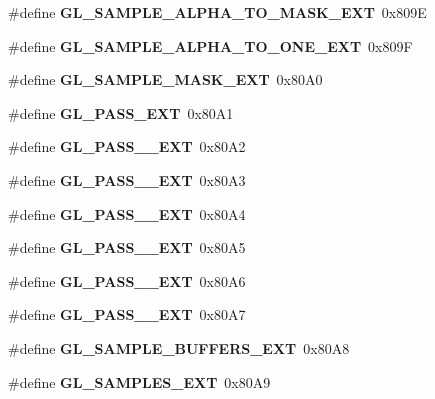 \begin{DoxyCompactItemize}
\item 
\#define {\bfseries G\+L\+\_\+\+S\+A\+M\+P\+L\+E\+\_\+\+A\+L\+P\+H\+A\+\_\+\+T\+O\+\_\+\+M\+A\+S\+K\+\_\+\+E\+X\+T}~0x809\+E\label{_s_d_l__opengl_8h_ac5e63b7e3a6d7e6077abd1b0928d5703}

\item 
\#define {\bfseries G\+L\+\_\+\+S\+A\+M\+P\+L\+E\+\_\+\+A\+L\+P\+H\+A\+\_\+\+T\+O\+\_\+\+O\+N\+E\+\_\+\+E\+X\+T}~0x809\+F\label{_s_d_l__opengl_8h_ae88b3a2be6a94fe1da034561d3a56c57}

\item 
\#define {\bfseries G\+L\+\_\+\+S\+A\+M\+P\+L\+E\+\_\+\+M\+A\+S\+K\+\_\+\+E\+X\+T}~0x80\+A0\label{_s_d_l__opengl_8h_a0981985e5742933b6f57389f22b95945}

\item 
\#define {\bfseries G\+L\+\_\+P\+A\+S\+S\+\_\+\+E\+X\+T}~0x80\+A1\label{_s_d_l__opengl_8h_aa579dedc63b8774f6162377800d97d06}

\item 
\#define {\bfseries G\+L\+\_\+P\+A\+S\+S\+\_\+\_\+\+E\+X\+T}~0x80\+A2\label{_s_d_l__opengl_8h_a8df9dfff1fd2f53863893c47d16af196}

\item 
\#define {\bfseries G\+L\+\_\+P\+A\+S\+S\+\_\+\_\+\+E\+X\+T}~0x80\+A3\label{_s_d_l__opengl_8h_a9b9ba9560380508a49f859b1b033313e}

\item 
\#define {\bfseries G\+L\+\_\+P\+A\+S\+S\+\_\+\_\+\+E\+X\+T}~0x80\+A4\label{_s_d_l__opengl_8h_a20711395009e86daa01f3ec50cb72764}

\item 
\#define {\bfseries G\+L\+\_\+P\+A\+S\+S\+\_\+\_\+\+E\+X\+T}~0x80\+A5\label{_s_d_l__opengl_8h_af4d9dedcdbc8dd19a33895a52afcd5de}

\item 
\#define {\bfseries G\+L\+\_\+P\+A\+S\+S\+\_\+\_\+\+E\+X\+T}~0x80\+A6\label{_s_d_l__opengl_8h_aea683ca5e3311bede30a33e8266c2774}

\item 
\#define {\bfseries G\+L\+\_\+P\+A\+S\+S\+\_\+\_\+\+E\+X\+T}~0x80\+A7\label{_s_d_l__opengl_8h_a12d7dd926ddb67cf6a7f2389fb01a8a6}

\item 
\#define {\bfseries G\+L\+\_\+\+S\+A\+M\+P\+L\+E\+\_\+\+B\+U\+F\+F\+E\+R\+S\+\_\+\+E\+X\+T}~0x80\+A8\label{_s_d_l__opengl_8h_a944f45feabb4567c7e05c35ad06ef77e}

\item 
\#define {\bfseries G\+L\+\_\+\+S\+A\+M\+P\+L\+E\+S\+\_\+\+E\+X\+T}~0x80\+A9\label{_s_d_l__opengl_8h_ac644054dc5173480a8a55dd2755518fd}


\end{DoxyCompactItemize}
